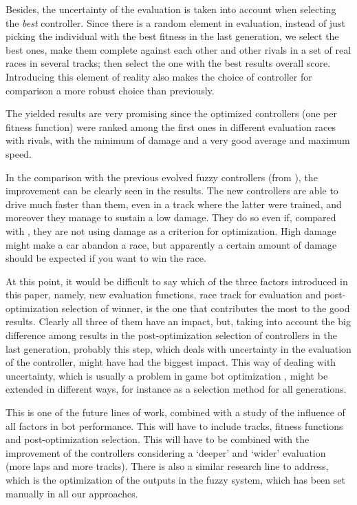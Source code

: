 \documentclass[conference]{IEEEtran}
\begin{document}
Besides, the uncertainty of the evaluation is taken into account when
selecting the {\em best} controller. Since there is a random element
in evaluation, instead of just picking the individual with the best fitness
in the last generation, we select the best ones, make them complete 
against each other and other rivals in a set of real races in several
tracks; then select the one
with the best results overall score. Introducing this element of reality also makes the
choice of controller for comparison a more robust choice than
previously. 

The yielded results are very promising since the optimized controllers
(one per fitness function) were ranked among the first ones in 
different evaluation races with rivals, with the minimum of damage and a very good average and maximum speed. 

In the comparison with the previous evolved fuzzy controllers (from \cite{salem_evo18}), the improvement can be clearly seen in the results. The
new controllers are able to drive much faster than them, even in a
track where the latter were trained, and moreover they manage to
sustain a low damage. They do so even if, compared with
\cite{salem_evo17,salem_evo18}, they are not using damage as a criterion for
optimization. High damage might make a car abandon a race, but
apparently a certain amount of damage should be expected if you want
to win the race. 

At this point, it would be difficult to say which of the three factors
introduced in this paper, namely, new evaluation functions, race track
for evaluation and post-optimization selection of winner, is the one
that contributes the most to the good results. Clearly all three of
them have an impact, but, taking into account the big difference among
results in the post-optimization selection of controllers in the last
generation, probably this step, which deals with uncertainty in the
evaluation of the controller, might have had the biggest
impact. This way of dealing with uncertainty, which is usually a
problem in game bot optimization \cite{merelo2016statistical}, might
be extended in different ways, for instance as a selection method
for all generations.

This is one of the future lines of work, combined with a study of the
influence of all factors in bot performance. This will have to include
tracks, fitness functions and post-optimization selection. This will
have to be combined with the improvement of the controllers
considering a `deeper' and `wider' evaluation (more laps and more
tracks). There is also a similar research line to address, which is the
optimization of the outputs in the fuzzy system, which has been set
manually in all our approaches. 
\end{document}
